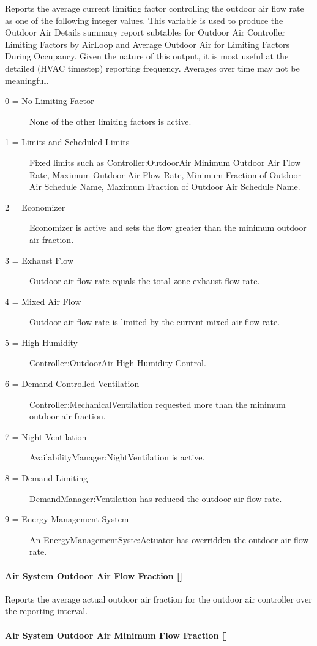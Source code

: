 Reports the average current limiting factor controlling the outdoor air flow rate as one of the following integer values. This variable is used to produce the Outdoor Air Details summary report subtables for Outdoor Air Controller Limiting Factors by AirLoop and Average Outdoor Air for Limiting Factors During Occupancy. Given the nature of this output, it is most useful at the detailed (HVAC timestep) reporting frequency. Averages over time may not be meaningful.
\begin{description}
  \item[0 = No Limiting Factor] None of the other limiting factors is active.
  \item[1 = Limits and Scheduled Limits] Fixed limits such as Controller:OutdoorAir Minimum Outdoor Air Flow Rate, Maximum Outdoor Air Flow Rate, Minimum Fraction of Outdoor Air Schedule Name, Maximum Fraction of Outdoor Air Schedule Name.
  \item[2 = Economizer] Economizer is active and sets the flow greater than the minimum outdoor air fraction.
  \item[3 = Exhaust Flow] Outdoor air flow rate equals the total zone exhaust flow rate.
  \item[4 = Mixed Air Flow] Outdoor air flow rate is limited by the current mixed air flow rate.
  \item[5 = High Humidity] Controller:OutdoorAir High Humidity Control.
  \item[6 = Demand Controlled Ventilation] Controller:MechanicalVentilation requested more than the minimum outdoor air fraction.
  \item[7 = Night Ventilation] AvailabilityManager:NightVentilation is active.
  \item[8 = Demand Limiting] DemandManager:Ventilation has reduced the outdoor air flow rate.
  \item[9 = Energy Management System] An EnergyManagementSyste:Actuator has overridden the outdoor air flow rate.
\end{description}


\paragraph{Air System Outdoor Air Flow Fraction {[]}}\label{air-system-outdoor-air-flow-fraction}

Reports the average actual outdoor air fraction for the outdoor air controller over the reporting interval.

\paragraph{Air System Outdoor Air Minimum Flow Fraction {[]}}\label{air-system-outdoor-air-minimum-flow-fraction}


